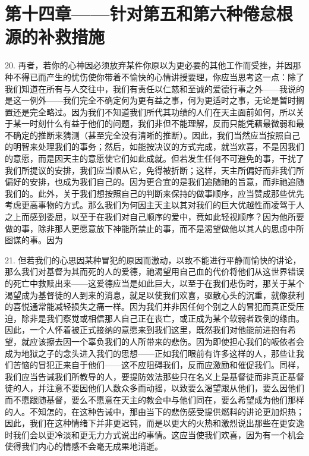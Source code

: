 \section{第十四章——针对第五和第六种倦怠根源的补救措施}

20. 再者，若你的心神因必须放弃某件你原以为更必要的其他工作而受挫，并因那种不得已而产生的忧伤使你带着不愉快的心情讲授要理，你应当思考这一点：除了我们知道在所有与人交往中，我们有责任以仁慈和至诚的爱德行事之外——我说的是这一例外——我们完全不确定何为更有益之事，何为更适时之事，无论是暂时搁置还是完全略过。因为我们不知道我们所代其功绩的人们在天主面前如何，所以关于某一时刻什么有益于他们的问题，我们非但不能理解，反而只能凭藉最微弱和最不确定的推断来猜测（甚至完全没有清晰的推断）。因此，我们当然应当按照自己的明智来处理我们的事务；然后，如能按决议的方式完成，就当欢喜，不是因我们的意愿，而是因天主的意愿使它们如此成就。但若发生任何不可避免的事，干扰了我们所提议的安排，我们应当顺从它，免得被折断；这样，天主所偏好而非我们所偏好的安排，也成为我们自己的。因为更合宜的是我们追随祂的旨意，而非祂追随我们的。此外，关于我们想按照自己的判断来保持的做事顺序，应当赞成那些优先考虑更高事物的方式。那么我们为何因主天主以其对我们的巨大优越性而凌驾于人之上而感到委屈，以至于在我们对自己顺序的爱中，竟如此轻视顺序？因为他所要做的事，除非那人更愿意放下神能所禁止的事，而不是渴望做他以其人的思虑中所图谋的事。因为\par

21. 但若我们的心思因某种冒犯的原因而激动，以致不能进行平静而愉快的讲论，那么我们对基督为其而死的人的爱德，祂渴望用自己血的代价将他们从这世界错误的死亡中救赎出来——这爱德应当是如此巨大，以至于在我们悲伤时，那关于某个渴望成为基督徒的人到来的消息，就足以使我们欢喜，驱散心头的沉重，就像获利的喜悦通常能减轻损失之痛一样。因为我们并非因任何个别之人的冒犯而真正受压迫，除非是我们察觉或相信那人自己正在丧亡，或正成为某个软弱者跌倒的缘由。因此，一个人怀着被正式接纳的意愿来到我们这里，既然我们对他能前进抱有希望，就应该擦去因一个辜负我们的人所带来的悲伤。因为即使担心我们的皈依者会成为地狱之子的念头进入我们的思想——正如我们眼前有许多这样的人，那些让我们苦恼的冒犯正来自于他们——这不应阻碍我们，反而应激励和催促我们。同样，我们应当告诫我们所教导的人，要提防效法那些只在名义上是基督徒而非真正基督徒的人，并注意不要因他们人数众多而动摇，以致要么渴望跟从他们，要么因他们而不愿跟随基督，要么不愿意在天主的教会中与他们同在，要么希望成为他们那样的人。不知怎的，在这种告诫中，那由当下的悲伤感受提供燃料的讲论更加炽热；因此，我们在这种情绪下并非更迟钝，而是以更大的火热和激烈说出那些在更安逸时我们会以更冷淡和更无力方式说出的事情。这应当使我们欢喜，因为有一个机会使得我们内心的情感不会毫无成果地消逝。\par

